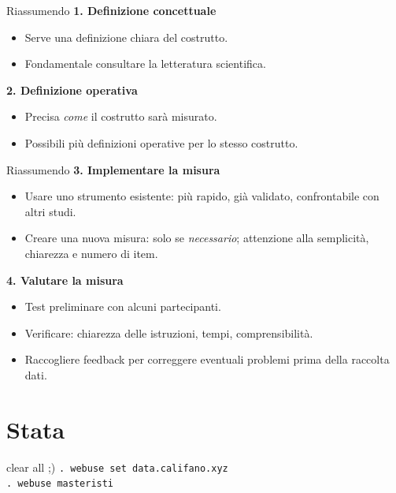 \documentclass{beamer}
\begin{document}
\begin{frame}{Riassumendo}
    \textbf{1. Definizione concettuale}
    \begin{itemize}
        \item Serve una definizione chiara del costrutto.
        \item Fondamentale consultare la letteratura scientifica.
    \end{itemize}
    \vspace{0.5em}
    \textbf{2. Definizione operativa}
    \begin{itemize}
        \item Precisa \emph{come} il costrutto sarà misurato.
        \item Possibili più definizioni operative per lo stesso costrutto.
    \end{itemize}
\end{frame}

\begin{frame}{Riassumendo}
    \textbf{3. Implementare la misura}
    \begin{itemize}
        \item Usare uno strumento esistente: più rapido, già validato, confrontabile con altri studi.
        \item Creare una nuova misura: solo se \emph{necessario}; attenzione alla semplicità, chiarezza e numero di item.
    \end{itemize}
    \vspace{0.5em}
    \textbf{4. Valutare la misura}
    \begin{itemize}
        \item Test preliminare con alcuni partecipanti.
        \item Verificare: chiarezza delle istruzioni, tempi, comprensibilità.
        \item Raccogliere feedback per correggere eventuali problemi prima della raccolta dati.
    \end{itemize}
\end{frame}

\section{Stata}
\begin{frame}{clear all ;)}
    \texttt{. webuse set data.califano.xyz} \\
    \texttt{. webuse masteristi}
\end{frame}
\end{document}
